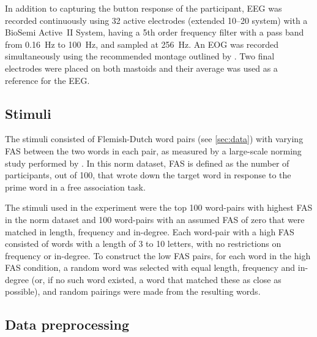 \documentclass[a4paper]{vanvliet_paper}
\begin{document}
In addition to capturing the button response of the participant, \gls{EEG} was recorded continuously using 32 active electrodes (extended 10--20 system) with a BioSemi Active~II System, having a 5th order frequency filter with a pass band from \SI{0.16}{\hertz} to \SI{100}{\hertz}, and sampled at \SI{256}{\hertz}.
An \gls{EOG} was recorded simultaneously using the recommended montage outlined by \textcite{Croft2000}.
Two final electrodes were placed on both mastoids and their average was used as a reference for the \gls{EEG}.


\subsection{Stimuli}

The stimuli consisted of Flemish-Dutch word pairs (see \autoref{sec:data}) with varying \gls{FAS} between the two words in each pair, as measured by a large-scale norming study performed by \textcite{DeDeyne2008}.
In this norm dataset, \gls{FAS} is defined as the number of participants, out of 100, that wrote down the target word in response to the prime word in a free association task.

The stimuli used in the experiment were the top 100 word-pairs with highest \gls{FAS} in the norm dataset and 100 word-pairs with an assumed \gls{FAS} of zero that were matched in length, frequency and in-degree. 
Each word-pair with a high \gls{FAS} consisted of words with a length of 3 to 10 letters, with no restrictions on frequency or in-degree.
To construct the low \gls{FAS} pairs, for each word in the high \gls{FAS} condition, a random word was selected with equal length, frequency and in-degree (or, if no such word existed, a word that matched these as close as possible), and random pairings were made from the resulting words.


\subsection{Data preprocessing}
\end{document}

